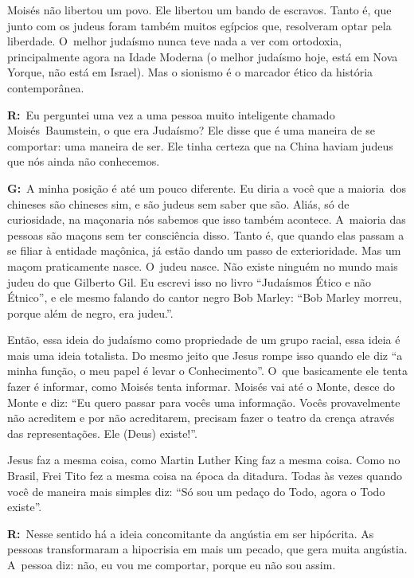 Moisés não libertou um povo. Ele libertou um bando de escravos. Tanto é,
que junto com os judeus foram também muitos egípcios que, resolveram
optar pela liberdade. O~melhor judaísmo nunca teve nada a ver com
ortodoxia, principalmente agora na Idade Moderna (o melhor judaísmo
hoje, está em Nova Yorque, não está em Israel). Mas o sionismo é o
marcador ético da história contemporânea.

 

\textbf{R:}~Eu perguntei uma vez a uma pessoa muito inteligente chamado
Moisés\textbf{}~Baumstein, o que era Judaísmo? Ele disse que é uma
maneira de se comportar: uma maneira de ser. Ele tinha certeza que na
China haviam judeus que nós ainda não conhecemos.

 

\textbf{G:}~A minha posição é até um pouco diferente. Eu diria a você
que a maioria\textbf{}~dos chineses são chineses sim, e são judeus sem
saber que são. Aliás, só de curiosidade, na maçonaria nós sabemos que
isso também acontece. A~maioria das pessoas são maçons sem ter
consciência disso. Tanto é, que quando elas passam a se filiar à
entidade maçônica, já estão dando um passo de exterioridade. Mas um
maçom praticamente nasce. O~judeu nasce. Não existe ninguém no mundo
mais judeu do que Gilberto Gil. Eu escrevi isso no livro ``Judaísmos
Ético e não Étnico'', e ele mesmo falando do cantor negro Bob Marley:
``Bob Marley morreu, porque além de negro, era judeu.''.

 

Então, essa ideia do judaísmo como propriedade de um grupo racial, essa
ideia é mais uma ideia totalista. Do mesmo jeito que Jesus rompe isso
quando ele diz ``a minha função, o meu papel é levar o Conhecimento''. O~que basicamente ele tenta fazer é informar, como Moisés tenta informar.
Moisés vai até o Monte, desce do Monte e diz: ``Eu quero passar para
vocês uma informação. Vocês provavelmente não acreditem e por não
acreditarem, precisam fazer o teatro da crença através das
representações. Ele (Deus) existe!''.

 

Jesus faz a mesma coisa, como Martin Luther King faz a mesma coisa. Como
no Brasil, Frei Tito fez a mesma coisa na época da ditadura. Todas às
vezes quando você de maneira mais simples diz: ``Só sou um pedaço do
Todo, agora o Todo existe''.

 

\textbf{R:}~Nesse sentido há a ideia concomitante da angústia em ser
hipócrita. As pessoas transformaram a hipocrisia em mais um pecado, que
gera muita angústia. A~pessoa diz: não, eu vou me comportar, porque eu
não sou assim.

